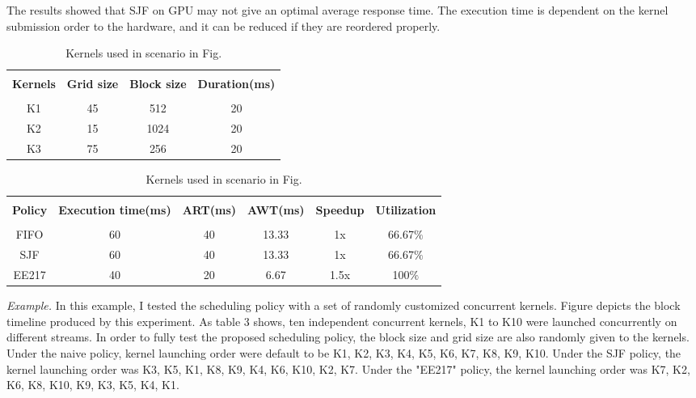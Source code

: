 \documentclass[12pt,journal,compsoc]{IEEEtran}
\begin{document}
 The results showed that SJF on GPU may not give an optimal average response time. The execution time is dependent on the kernel submission order to the hardware, and it can be reduced if they are reordered properly.

\begin{table}[ht]
   \caption{Kernels used in scenario in Fig. } %
   \centering
   \begin{tabular}{|c|c|c|c|}
   \hline\\
   \bf Kernels & \bf Grid size & \bf Block size & \bf Duration(ms)\\
   \hline\\
   K1 & 45 & 512 & 20 \\
   K2 & 15 & 1024 & 20\\ 
   K3 & 75 & 256 & 20 \\
   \hline
   \end{tabular}
   \label{table:scenario1_kernel}
\end{table}

\begin{table*}[ht]
   \caption{Kernels used in scenario in Fig. } %
   \centering
   \begin{tabular}{|c|c|c|c|c|c|}
   \hline\\
   \bf Policy & \bf Execution time(ms)& \bf ART(ms) & \bf AWT(ms) & \bf Speedup & \bf Utilization \\
   \hline\\
   FIFO & 60 & 40 & 13.33 & 1x & 66.67$\%$ \\
   SJF & 60 & 40 & 13.33 & 1x & 66.67$\%$\\ 
   EE217 & 40 & 20 & 6.67 & 1.5x & 100$\%$\\
   \hline
   \end{tabular}
   \label{table:scenario1_result}
\end{table*}


\textit{Example.}
In this example, I tested the scheduling policy with a set of randomly customized concurrent kernels. Figure depicts the block timeline produced by this experiment. As table 3 shows, ten independent concurrent kernels, K1 to K10 were launched concurrently on different streams. In order to fully test the proposed scheduling policy, the block size and grid size are also randomly given to the kernels. Under the naive policy, kernel launching order were default to be K1, K2, K3, K4, K5, K6, K7, K8, K9, K10. Under the SJF policy, the kernel launching order was K3, K5, K1, K8, K9, K4, K6, K10, K2, K7. Under the "EE217" policy, the kernel launching order was K7, K2, K6, K8, K10, K9, K3, K5, K4, K1.
\end{document}
